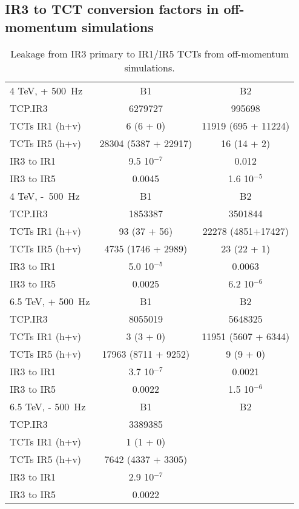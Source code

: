 \subsection{IR3 to TCT conversion factors in off-momentum simulations}
\begin{table}[!h]
   \centering
   \caption{Leakage from IR3 primary to IR1/IR5 TCTs from off-momentum simulations.}

   \begin{tabular}{l|c|c}
       \hline
       4 TeV, + 500~Hz  & B1 & B2\\
       TCP.IR3  & 6279727 & 995698  \\
       TCTs IR1 (h+v) & 6 (6 + 0) & 11919 (695 + 11224) \\
       TCTs IR5 (h+v) & 28304 (5387 + 22917) & 16 (14 + 2) \\
       IR3 to IR1 & 9.5 10$^{-7}$ & 0.012 \\
       IR3 to IR5 & 0.0045 & 1.6 10$^{-5}$ \\
       \hline
       4 TeV, -~500~Hz  & B1 & B2\\
       TCP.IR3  & 1853387 & 3501844 \\
       TCTs IR1 (h+v) & 93 (37 + 56) & 22278 (4851+17427) \\
       TCTs IR5 (h+v) &  4735 (1746 + 2989) & 23 (22 + 1) \\
       IR3 to IR1 & 5.0 10$^{-5}$ & 0.0063 \\
       IR3 to IR5 & 0.0025 & 6.2 10$^{-6}$ \\
       \hline

       6.5 TeV, + 500~Hz  & B1 & B2\\
       TCP.IR3  & 8055019 & 5648325  \\
       TCTs IR1 (h+v) & 3 (3 + 0) & 11951 (5607 + 6344) \\
       TCTs IR5 (h+v) & 17963 (8711 + 9252) & 9 (9 + 0)\\
       IR3 to IR1 & 3.7 10$^{-7}$ & 0.0021 \\
       IR3 to IR5 & 0.0022 & 1.5 10$^{-6}$ \\
       \hline
       6.5 TeV, - 500~Hz  & B1 & B2\\
       TCP.IR3  &  3389385 &   \\
       TCTs IR1 (h+v) &  1 (1 + 0) &   \\
       TCTs IR5 (h+v) &  7642 (4337 + 3305) &  \\
       IR3 to IR1 &  2.9 10$^{-7}$ &  \\
       IR3 to IR5 &  0.0022 &   \\
       \hline

   \end{tabular}
   \label{leakageFactorsIR3}
\end{table}



